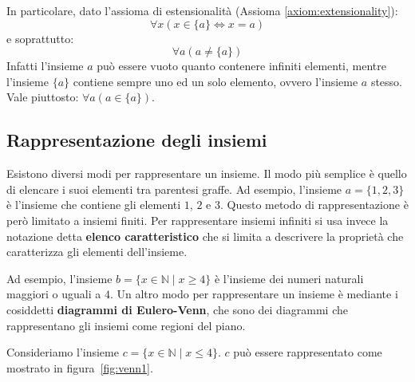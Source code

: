 
In particolare, dato l'assioma di estensionalità (Assioma \ref{axiom:extensionality}):
\begin{displaymath}
	\forall x (x \in \{a\} \iff x=a)
\end{displaymath}
e soprattutto:
\begin{displaymath}
	\forall a ( a \neq \{a\} )
\end{displaymath}
Infatti l'insieme $a$ può essere vuoto quanto contenere infiniti elementi, mentre l'insieme $\{a\}$ contiene sempre uno ed un solo elemento, ovvero l'insieme $a$ stesso. Vale piuttosto: $\forall a(a \in \{a\})$.

\subsection{Rappresentazione degli insiemi}
Esistono diversi modi per rappresentare un insieme. Il modo più semplice è quello di elencare i suoi elementi tra parentesi graffe. Ad esempio, l'insieme $a=\{1,2,3\}$ è l'insieme che contiene gli elementi $1$, $2$ e $3$. Questo metodo di rappresentazione è però limitato a insiemi finiti. Per rappresentare insiemi infiniti si usa invece la notazione detta \textbf{elenco caratteristico} che si limita a descrivere la proprietà che caratterizza gli elementi dell'insieme. 

Ad esempio, l'insieme $b=\{x \in \mathbb{N} \; | \; x \geq 4\}$ è l'insieme dei numeri naturali maggiori o uguali a $4$. Un altro modo per rappresentare un insieme è mediante i cosiddetti \textbf{diagrammi di Eulero-Venn}, che sono dei diagrammi che rappresentano gli insiemi come regioni del piano.

\begin{example}
	Consideriamo l'insieme $c=\{x \in \mathbb{N} \; | \; x \leq 4\}$. $c$ può essere rappresentato come mostrato in figura~\ref{fig:venn1}.
	\begin{center}
		\label{fig:venn1}
	\end{center}
\end{example}

